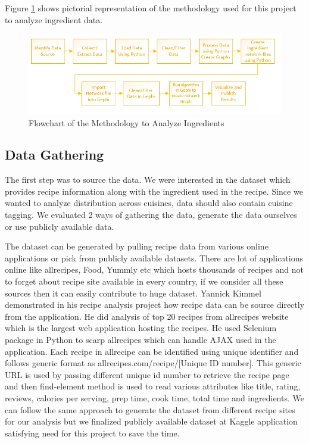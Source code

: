 \documentclass[sigconf]{acmart}
\begin{document}
Figure \ref{f:methodology} shows pictorial representation of the methodology used for this project to analyze ingredient data.
\begin{figure}[!ht]
  \centering\includegraphics[width=\columnwidth]{images/methodology.PNG}
  \caption{Flowchart of the Methodology to Analyze Ingredients }\label{f:methodology}
\end{figure}


\subsection{Data Gathering}
The first step was to source the data. We were interested in the dataset which provides recipe information along with the ingredient used in the recipe. Since we wanted to analyze distribution across cuisines, data should also contain cuisine tagging. We evaluated 2 ways of gathering the data, generate the data ourselves or use publicly available data.  

The dataset can be generated by pulling recipe data from various online applications or pick from publicly available datasets. There are lot of applications online like allrecipes, Food, Yummly etc which hosts thousands of recipes and not to forget about recipe site available in every country, if we consider all these sources then it can easily contribute to huge dataset. Yannick Kimmel \cite{www-nyc} demonstrated in his recipe analysis project how recipe data can be source directly from the application. He did analysis of top 20 recipes from allrecipes website which is the largest web application hosting the recipes. He used Selenium package in Python to scarp allrecipes which can handle AJAX used in the application. Each recipe in allrecipe can be identified using unique identifier and follows generic format as allrecipes.com/recipe/[Unique ID number]. This generic URL is used by passing different unique id number to retrieve the recipe page and then find-element method is used to read various attributes like title, rating, reviews, calories per serving, prep time, cook time, total time and ingredients. We can follow the same approach to generate the dataset from different recipe sites for our analysis but we finalized publicly available dataset at Kaggle application satisfying need for this project to save the time.
\end{document}
